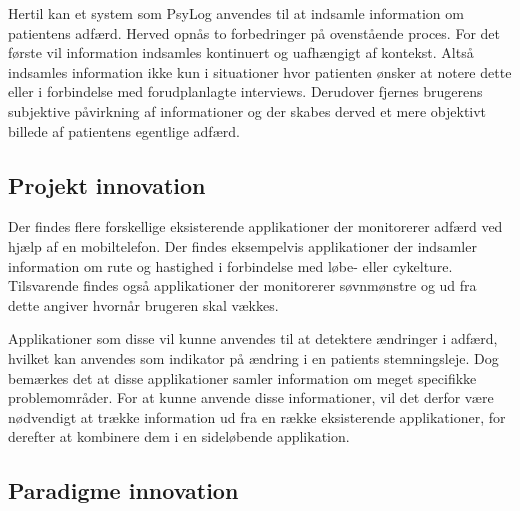 Hertil kan et system som PsyLog anvendes til at indsamle information om patientens adfærd.
Herved opnås to forbedringer på ovenstående proces.
For det første vil information indsamles kontinuert og uafhængigt af kontekst.
Altså indsamles information ikke kun i situationer hvor patienten ønsker at notere dette eller i forbindelse med forudplanlagte interviews.
Derudover fjernes brugerens subjektive påvirkning af informationer og der skabes derved et mere objektivt billede af patientens egentlige adfærd.

\subsection{Projekt innovation}
Der findes flere forskellige eksisterende applikationer der monitorerer adfærd ved hjælp af en mobiltelefon.
Der findes eksempelvis applikationer der indsamler information om rute og hastighed i forbindelse med løbe- eller cykelture.
Tilsvarende findes også applikationer der monitorerer søvnmønstre og ud fra dette angiver hvornår brugeren skal vækkes.

Applikationer som disse vil kunne anvendes til at detektere ændringer i adfærd, hvilket kan anvendes som indikator på ændring i en patients stemningsleje.
Dog bemærkes det at disse applikationer samler information om meget specifikke problemområder.
For at kunne anvende disse informationer, vil det derfor være nødvendigt at trække information ud fra en række eksisterende applikationer, for derefter at kombinere dem i en sideløbende applikation.

\subsection{Paradigme innovation}
